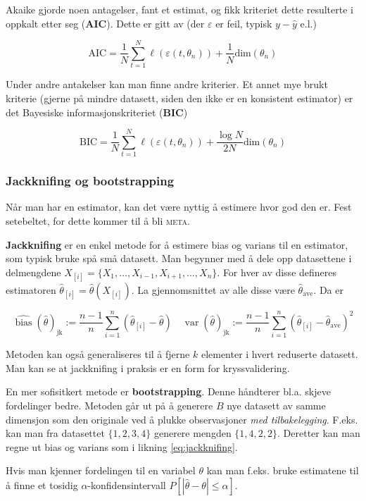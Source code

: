 Akaike gjorde noen antagelser, fant et estimat, og fikk kriteriet dette resulterte i oppkalt etter seg (\textbf{AIC}). Dette er gitt av (der $\varepsilon$ er feil, typisk $y - \hat{y}$ e.l.)

\begin{equation}
	\textrm{AIC} = \frac{1}{N} \sum_{t = 1}^N \ell (\varepsilon (t, \theta_n)) + \frac{1}{N} \textrm{dim}(\theta_n)
\end{equation}

Under andre antakelser kan man finne andre kriterier. Et annet mye brukt kriterie (gjerne på mindre datasett, siden den ikke er en konsistent estimator) er det Bayesiske informasjonskriteriet (\textbf{BIC})

\begin{equation}
	\textrm{BIC} = \frac{1}{N} \sum_{t = 1}^N \ell (\varepsilon (t, \theta_n)) + \frac{\log N}{2N} \textrm{dim}(\theta_n)
\end{equation}

\subsubsection{Jackknifing og bootstrapping}
Når man har en estimator, kan det være nyttig å estimere hvor god den er. Fest setebeltet, for dette kommer til å bli \textsc{meta}.

\textbf{Jackknifing} er en enkel metode for å estimere bias og varians til en estimator, som typisk bruke spå små datasett. Man begynner med å dele opp datasettene i delmengdene $X_{[i]} = \{X_1, \dots, X_{i-1}, X_{i+1}, \dots, X_n\}$. For hver av disse defineres estimatoren $\hat{\theta}_{[i]} = \hat{\theta}(X_{[i]})$. La gjennomsnittet av alle disse være $\hat{\theta}_{\textrm{ave}}$. Da er

\begin{equation}
	\widehat{\operatorname{bias}}(\widehat{\theta})_{\mathrm{jk}}:=\frac{n-1}{n} \sum_{i=1}^{n}\left(\widehat{\theta}_{[i]}-\widehat{\theta}\right) \quad \operatorname{var}(\widehat{\theta})_{\mathrm{jk}}:=\frac{n-1}{n} \sum_{i=1}^{n}\left(\widehat{\theta}_{[i]}-\widehat{\theta}_{\mathrm{ave}}\right)^{2}
	\label{eq:jackknifing}
\end{equation}

Metoden kan også generaliseres til å fjerne $k$ elementer i hvert reduserte datasett. Man kan se at jackknifing i praksis er en form for kryssvalidering.

En mer sofisitkert metode er \textbf{bootstrapping}. Denne håndterer bl.a. skjeve fordelinger bedre. Metoden går ut på å generere $B$ nye datasett av samme dimensjon som den originale ved å plukke observasjoner \textit{med tilbakelegging}. F.eks. kan man fra datasettet $\{1, 2, 3, 4\}$ generere mengden $\{1, 4, 2, 2\}$. Deretter kan man regne ut bias og varians som i likning \ref{eq:jackknifing}.

Hvis man kjenner fordelingen til en variabel $\theta$ kan man f.eks. bruke estimatene til å finne et tosidig $\alpha$-konfidensintervall $P[ | \hat{\theta} - \theta | \leq \alpha ]$. 


